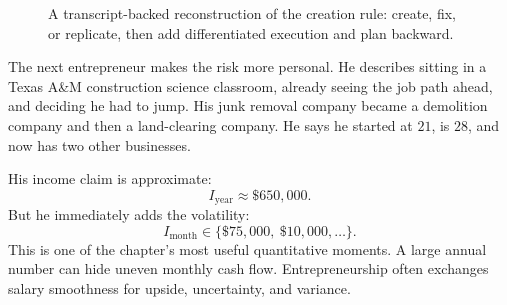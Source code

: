 \begin{figure}
\centering
{}
\caption{A transcript-backed reconstruction of the creation rule: create, fix, or replicate, then add differentiated execution and plan backward.}
\end{figure}

The next entrepreneur makes the risk more personal. He describes sitting in a Texas A\&M construction science classroom, already seeing the job path ahead, and deciding he had to jump. His junk removal company became a demolition company and then a land-clearing company. He says he started at \(21\), is \(28\), and now has two other businesses.

His income claim is approximate:
\begin{equation}
I_{\mathrm{year}} \approx \$650{,}000.
\end{equation}
But he immediately adds the volatility:
\begin{equation}
I_{\mathrm{month}} \in \{\$75{,}000,\ \$10{,}000,\ldots\}.
\end{equation}
This is one of the chapter's most useful quantitative moments. A large annual number can hide uneven monthly cash flow. Entrepreneurship often exchanges salary smoothness for upside, uncertainty, and variance.

